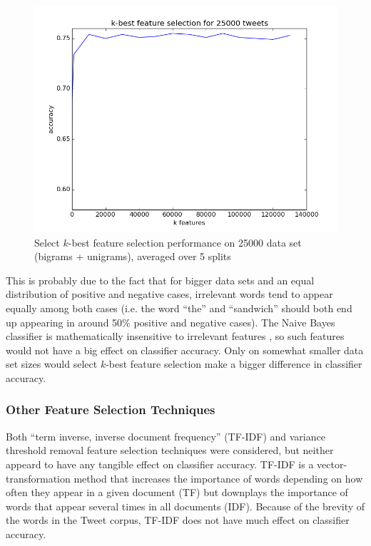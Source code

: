 \documentclass[letter,12pt]{article}
\begin{document}
\begin{figure}[h]
  \centering
  \includegraphics[width=0.8\linewidth]{img/k_best}
  \caption{Select $k$-best feature selection performance on 25000 data set
  (bigrams + unigrams), averaged over 5 splits}
  \label{fig:k_best}
\end{figure}

This is probably due to the fact that for bigger data sets and an equal
distribution of positive and negative cases, irrelevant words tend to appear
equally among both cases (i.e. the word ``the'' and ``sandwich'' should both
end up appearing in around 50\%
positive and negative cases). The Naive Bayes classifier is mathematically
insensitive to irrelevant features \cite{manning08}, so such features would not
have a big effect on classifier accuracy. Only on somewhat smaller data set sizes would
select $k$-best feature selection make a bigger difference in classifier
accuracy.

\subsubsection{Other Feature Selection Techniques}
\label{ssub:variance_threshold_feature_removal}

Both ``term inverse, inverse document frequency'' (TF-IDF) and variance
threshold removal feature selection techniques were considered, but neither
appeard to
have any tangible effect on classifier accuracy. TF-IDF is a
vector-transformation method that increases the importance of words depending on
how often they appear in a given document (TF) but downplays the importance of
words that appear several times in all documents (IDF). Because of the brevity
of the words in the Tweet corpus, TF-IDF does not have much effect on
classifier accuracy.
\end{document}
